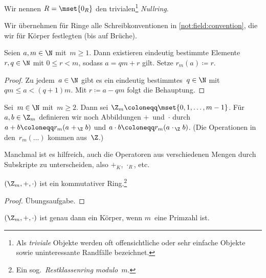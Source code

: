 \documentclass[a4paper]{article}
\begin{document}
\begin{notation}[Nullring]
    Wir nennen $R = \mset{0_R}$ den trivialen\footnote{Als \emph{triviale} Objekte werden oft offensichtliche oder sehr einfache Objekte sowie uninteressante Randfälle bezeichnet.} \emph{Nullring}.
\end{notation}

Wir übernehmen für Ringe alle Schreibkonventionen in \cref{not:field:convention}, die wir für Körper festlegten (bis auf Brüche).

\begin{lemma}
    Seien $a, m \in \N$ mit~$m \geq 1$. Dann existieren eindeutig bestimmte Elemente $r, q \in \N$ mit $0 \leq r < m$, sodass $a = qm+r$ gilt. Setze $r_m(a) \coloneqq r$.
\end{lemma}

\begin{proof}
    Zu jedem~$a \in \N$ gibt es ein eindeutig bestimmtes~$q \in \N$ mit $qm \leq a < (q+1)m$. Mit $r \coloneqq a-qm$ folgt die Behauptung.
\end{proof}

\begin{definition}[$\Z$~modulo~$m$]
    Sei~$m \in \N$ mit~$m \geq 2$. Dann sei $\Z_m \coloneqq \mset{0, 1, \dots, m-1}$. Für $a, b \in \Z_m$ definieren wir noch Abbildungen $+$~und~$\cdot$ durch $a+b \coloneqq r_m(a\mathrel{+_{\,\Z}}b)$ und $a\cdot b \coloneqq r_m(a\mathrel{\cdot_{\,\Z}}b)$. (Die Operationen in den~$r_m(\dots)$ kommen aus~$\Z$.)
\end{definition}

Manchmal ist es hilfreich, auch die Operatoren aus verschiedenen Mengen durch Subskripte zu unterscheiden, also $+_K$, $\cdot_R$, etc.

\begin{lemma}
    $(\Z_m, +, \cdot)$ ist ein kommutativer Ring.\footnote{Ein sog.\ \emph{Restklassenring modulo~$m$}.}
\end{lemma}

\begin{proof}
    Übungsaufgabe.
\end{proof}

\begin{lemma}
    $(\Z_m, +, \cdot)$ ist genau dann ein Körper, wenn $m$~eine Primzahl ist.
\end{lemma}
\end{document}
